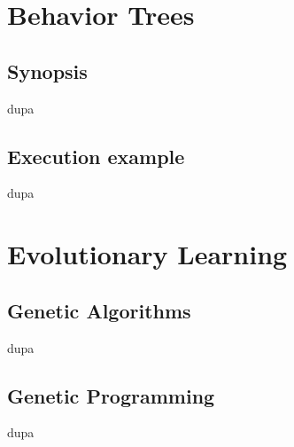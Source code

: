 \section{Behavior Trees}
\subsection{Synopsis}
dupa
\subsection{Execution example}
dupa
\section{Evolutionary Learning}
\subsection{Genetic Algorithms}
dupa
\subsection{Genetic Programming}
dupa
